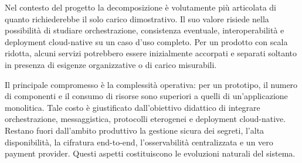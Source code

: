 \documentclass[12pt,a4paper,twoside]{report}
\begin{document}
Nel contesto del progetto la decomposizione è volutamente più articolata di
quanto richiederebbe il solo carico dimostrativo. Il suo valore risiede nella
possibilità di studiare orchestrazione, consistenza eventuale,
interoperabilità e deployment cloud-native su un caso d'uso completo. Per
un prodotto con scala ridotta, alcuni servizi potrebbero essere inizialmente
accorpati e separati soltanto in presenza di esigenze organizzative o di
carico misurabili.

Il principale compromesso è la complessità operativa: per un prototipo, il
numero di componenti e il consumo di risorse sono superiori a quelli di
un'applicazione monolitica. Tale costo è giustificato dall'obiettivo
didattico di integrare orchestrazione, messaggistica, protocolli eterogenei e
deployment cloud-native. Restano fuori dall'ambito produttivo la gestione
sicura dei segreti, l'alta disponibilità, la cifratura end-to-end,
l'osservabilità centralizzata e un vero payment provider. Questi aspetti
costituiscono le evoluzioni naturali del sistema.
\end{document}
